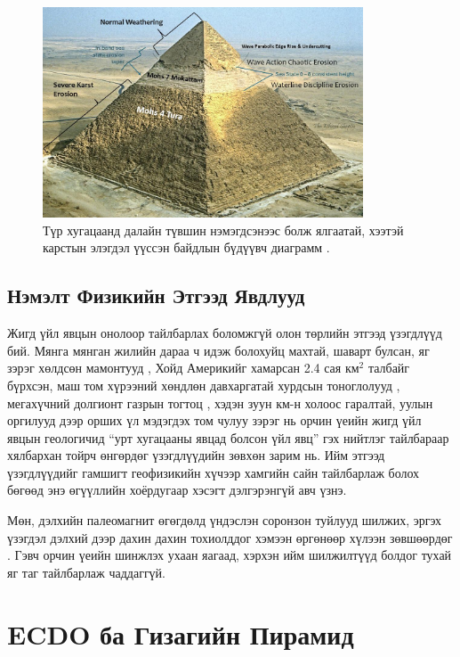 \documentclass[10pt,twocolumn,letterpaper]{article}
\begin{document}
\begin{figure}[t]
\begin{center}
\includegraphics[width=0.85\textwidth]{khafre.jpg}
\end{center}
   \caption{Түр хугацаанд далайн түвшин нэмэгдсэнээс болж ялгаатай, хээтэй карстын элэгдэл үүссэн байдлын бүдүүвч диаграмм \cite{27}.}
\label{fig:4}
\end{figure}
\subsection{Нэмэлт Физикийн Этгээд Явдлууд}

Жигд үйл явцын онолоор тайлбарлах боломжгүй олон төрлийн этгээд үзэгдлүүд бий. Мянга мянган жилийн дараа ч идэж болохуйц махтай, шаварт булсан, яг зэрэг хөлдсөн мамонтууд \cite{17,18,19}, Хойд Америкийг хамарсан 2.4 сая км$^2$ талбайг бүрхсэн, маш том хүрээний хөндлөн давхаргатай хурдсын тоноглолууд \cite{21}, мегахүчний долгионт газрын тогтоц \cite{22}, хэдэн зуун км-н холоос гаралтай, уулын оргилууд дээр орших үл мэдэгдэх том чулуу \cite{23,26} зэрэг нь орчин үеийн жигд үйл явцын геологичид “урт хугацааны явцад болсон үйл явц” гэх нийтлэг тайлбараар хялбархан тойрч өнгөрдөг үзэгдлүүдийн зөвхөн зарим нь. Ийм этгээд үзэгдлүүдийг гамшигт геофизикийн хүчээр хамгийн сайн тайлбарлаж болох бөгөөд энэ өгүүллийн хоёрдугаар хэсэгт дэлгэрэнгүй авч үзнэ.

Мөн, дэлхийн палеомагнит өгөгдөлд үндэслэн соронзон туйлууд шилжих, эргэх үзэгдэл дэлхий дээр дахин дахин тохиолддог хэмээн өргөнөөр хүлээн зөвшөөрдөг \cite{35,40,41}. Гэвч орчин үеийн шинжлэх ухаан яагаад, хэрхэн ийм шилжилтүүд болдог тухай яг таг тайлбарлаж чаддаггүй.

\section{ECDO ба Гизагийн Пирамид}
\end{document}
